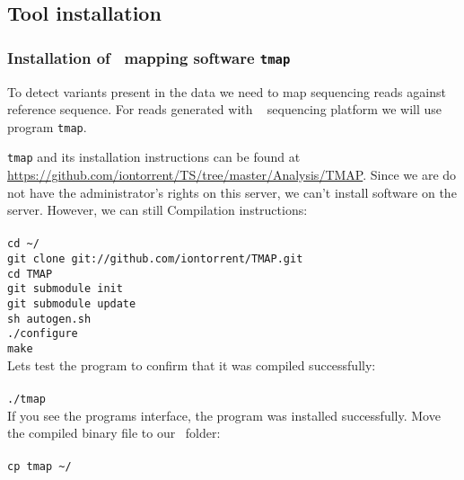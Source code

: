 \subsection{Tool installation}
\subsubsection{Installation of \IonTorrent~mapping software \texttt{tmap}}
To detect variants present in the data we need to map sequencing
reads against reference sequence. For reads generated with \IonTorrent~
sequencing platform we will use program \texttt{tmap}.

\texttt{tmap} and its installation instructions can
be found at \url{https://github.com/iontorrent/TS/tree/master/Analysis/TMAP}.
Since we are do not have the administrator's rights on this server, we can't install
software on the server. However, we can still 
Compilation instructions:\\~\\
\texttt{cd \textasciitilde/\progDir}\\
\texttt{git clone git://github.com/iontorrent/TMAP.git}\\
\texttt{cd TMAP}\\
\texttt{git submodule init}\\
\texttt{git submodule update}\\
\texttt{sh autogen.sh}\\
\texttt{./configure}\\
\texttt{make}\\

Lets test the program to confirm that it was compiled successfully:\\~\\
\texttt{./tmap}\\

If you see the programs interface, the program was installed successfully.
Move the compiled binary file to our \texttt{\binDir}~folder:\\~\\
\texttt{cp tmap \textasciitilde/\binDir}\\
